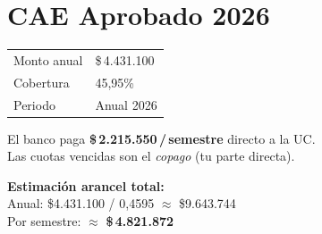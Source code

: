 \documentclass[10pt,a4paper]{article}
\begin{document}
\begin{minipage}[t]{0.46\textwidth}
\vspace{6pt}

\section{CAE Aprobado 2026}

{\small
\begin{tabular}{@{}ll@{}}
  Monto anual & \$\,4.431.100 \\
  Cobertura   & 45{,}95\%    \\
  Periodo     & Anual 2026   \\
\end{tabular}

\vspace{4pt}
El banco paga \textbf{\$\,2.215.550\,/\,semestre} directo a la UC.\\
Las cuotas vencidas son el \textit{copago} (tu parte directa).

\vspace{4pt}
\textbf{Estimación arancel total:}\\
Anual: \$4.431.100 / 0{,}4595 $\approx$ \$9.643.744\\
Por semestre: $\approx$ \textbf{\$\,4.821.872}
}

\end{minipage}%
\hfill%
\end{document}
